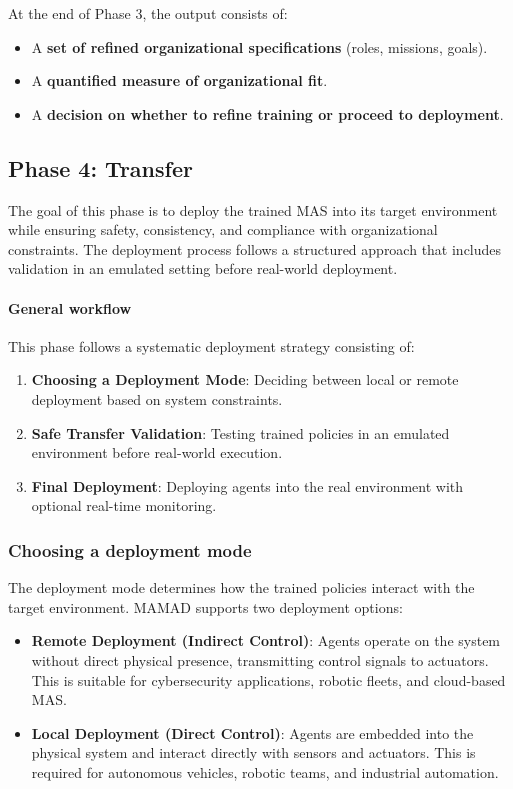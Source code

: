 \documentclass[pdflatex,sn-mathphys-num]{sn-jnl}%
\theoremstyle{thmstyleone}%
\theoremstyle{thmstyletwo}%
\theoremstyle{thmstylethree}%
\begin{document}
At the end of Phase 3, the output consists of:
\begin{itemize}
    \item A \textbf{set of refined organizational specifications} (roles, missions, goals).
    \item A \textbf{quantified measure of organizational fit}.
    \item A \textbf{decision on whether to refine training or proceed to deployment}.
\end{itemize}



\subsection{Phase 4: Transfer}

The goal of this phase is to deploy the trained MAS into its target environment while ensuring safety, consistency, and compliance with organizational constraints. The deployment process follows a structured approach that includes validation in an emulated setting before real-world deployment.

\paragraph{\textbf{General workflow}}
This phase follows a systematic deployment strategy consisting of:
\begin{enumerate}
    \item \textbf{Choosing a Deployment Mode}: Deciding between local or remote deployment based on system constraints.
    \item \textbf{Safe Transfer Validation}: Testing trained policies in an emulated environment before real-world execution.
    \item \textbf{Final Deployment}: Deploying agents into the real environment with optional real-time monitoring.
\end{enumerate}

\subsubsection{Choosing a deployment mode}
The deployment mode determines how the trained policies interact with the target environment. MAMAD supports two deployment options:

\begin{itemize}
    \item \textbf{Remote Deployment (Indirect Control)}: Agents operate on the system without direct physical presence, transmitting control signals to actuators. This is suitable for cybersecurity applications, robotic fleets, and cloud-based MAS.
    \item \textbf{Local Deployment (Direct Control)}: Agents are embedded into the physical system and interact directly with sensors and actuators. This is required for autonomous vehicles, robotic teams, and industrial automation.
\end{itemize}
\end{document}
